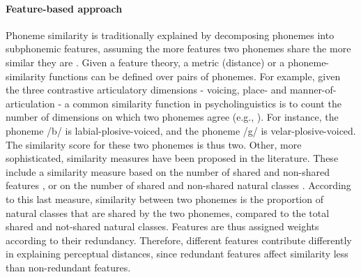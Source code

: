 \paragraph{Feature-based approach}
Phoneme similarity is traditionally explained by decomposing phonemes into subphonemic features, assuming the more features two phonemes share the more similar they are \citep{Tversky1977, Shepard1987, Cohen2009, Cohen2010}. Given a feature theory, a metric (distance) or a phoneme-similarity functions can be defined over pairs of phonemes. For example, given the three contrastive articulatory dimensions - voicing, place- and manner-of-articulation - a common similarity function in psycholinguistics is to count the number of dimensions on which two phonemes agree (e.g., \citealp{mcmillan2010cascading, Bailey2005, mousikou2015masked}). For instance, the phoneme /b/ is labial-plosive-voiced, and the phoneme /g/ is velar-plosive-voiced. The similarity score for these two phonemes is thus two. Other, more sophisticated, similarity measures have been proposed in the literature. These include a similarity measure based on the number of shared and non-shared features \citep{Pierrehumbert1993}, or on the number of shared and non-shared natural classes \citep{Frisch1997}. According to this last measure, similarity between two phonemes is the proportion of natural classes that are shared by the two phonemes, compared to the total shared and not-shared natural classes. Features are thus assigned weights according to their redundancy. Therefore, different features contribute differently in explaining perceptual distances, since redundant features affect similarity less than non-redundant features.

